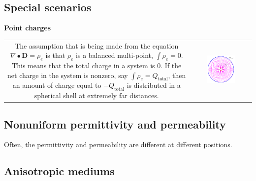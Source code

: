\subsection{Special scenarios}

\textbf{Point charges}

\begin{tabular}{cc}
\parbox{0.5\textwidth}{
The assumption that is being made from the equation \(\nabla \bullet \mathbf{D} = \rho_e\) is that \(\rho_e\) is a balanced multi-point, \(\int \rho_e = 0\). This means that the total charge in a system is \(0\). If the net charge in the system is nonzero, say \(\int \rho_e = Q_{\text{total}}\), then an amount of charge equal to \(-Q_{\text{total}}\) is distributed in a spherical shell at extremely far distances.   
} & \parbox{0.5\textwidth}{
\includegraphics[width = 0.5\textwidth]{Duality/charge_sphere_at_infinity}
}
\end{tabular}




\subsection{Nonuniform permittivity and permeability} 

Often, the permittivity and permeability are different at different positions.



\subsection{Anisotropic mediums}










